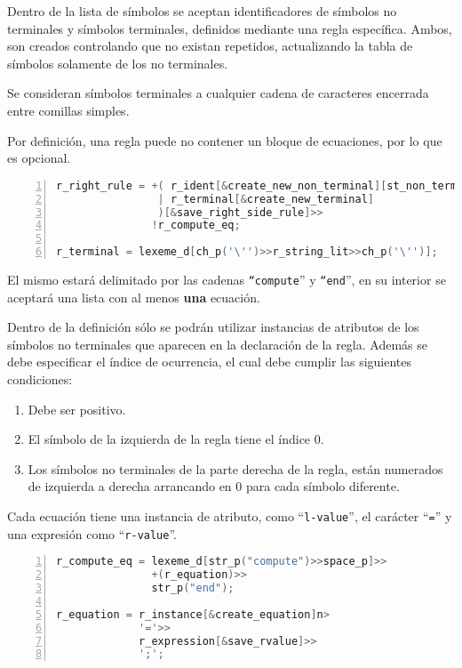 Dentro de la lista de símbolos se aceptan identificadores de símbolos no terminales y símbolos terminales, definidos mediante una regla específica. Ambos, son creados controlando que no existan repetidos, actualizando la tabla de símbolos solamente de los no terminales.

Se consideran símbolos terminales a cualquier cadena de caracteres encerrada entre comillas simples.

Por definición, una regla puede no contener un bloque de ecuaciones, por lo que es opcional.

\begin{lstlisting}[language=C++, basicstyle=\scriptsize, numbers=left, numbersep=5pt, numberstyle=\tiny]
r_right_rule = +( r_ident[&create_new_non_terminal][st_non_terminal.add]
                | r_terminal[&create_new_terminal]
                )[&save_right_side_rule]>>
               !r_compute_eq;

r_terminal = lexeme_d[ch_p('\'')>>r_string_lit>>ch_p('\'')];
\end{lstlisting}

El mismo estará delimitado por las cadenas \texttt{``compute}'' y \texttt{``end}'', en su interior se aceptará una lista con al menos \textbf{una} ecuación.

Dentro de la definición sólo se podrán utilizar instancias de atributos de los símbolos no terminales que aparecen en la declaración de la regla. Además se debe especificar el índice de ocurrencia, el cual debe cumplir las siguientes condiciones:

\begin{enumerate}
\item Debe ser positivo.
\item El símbolo de la izquierda de la regla tiene el índice 0.
\item Los símbolos no terminales de la parte derecha de la regla, están numerados de izquierda a derecha arrancando en 0 para cada símbolo diferente.
\end{enumerate}

Cada ecuación tiene una instancia de atributo, como ``\texttt{l-value}'', el carácter ``\texttt{=}'' y una expresión como ``\texttt{r-value}''.

\begin{lstlisting}[language=C++, basicstyle=\scriptsize, numbers=left, numbersep=5pt, numberstyle=\tiny]
r_compute_eq = lexeme_d[str_p("compute")>>space_p]>>
               +(r_equation)>>
               str_p("end");

r_equation = r_instance[&create_equation]n>
             '='>>
             r_expression[&save_rvalue]>>
             ';';
\end{lstlisting}

